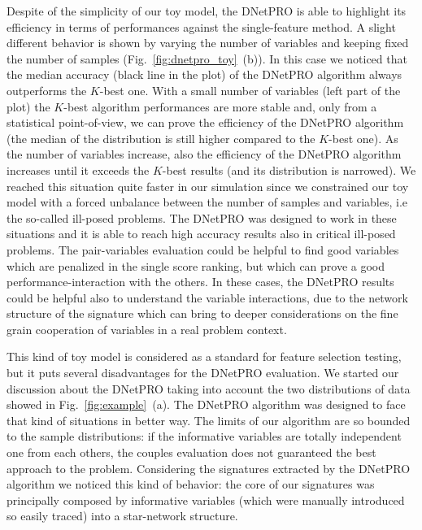 \documentclass{standalone}
\begin{document}
Despite of the simplicity of our toy model, the \textsf{DNetPRO} is able to highlight its efficiency in terms of performances against the single-feature method.
A slight different behavior is shown by varying the number of variables and keeping fixed the number of samples (Fig.~\ref{fig:dnetpro_toy}~(b)).
In this case we noticed that the median accuracy (black line in the plot) of the \textsf{DNetPRO} algorithm always outperforms the $K$-best one.
With a small number of variables (left part of the plot) the $K$-best algorithm performances are more stable and, only from a statistical point-of-view, we can prove the efficiency of the \textsf{DNetPRO} algorithm (the median of the distribution is still higher compared to the $K$-best one).
As the number of variables increase, also the efficiency of the \textsf{DNetPRO} algorithm increases until it exceeds the $K$-best results (and its distribution is narrowed).
We reached this situation quite faster in our simulation since we constrained our toy model with a forced unbalance between the number of samples and variables, i.e the so-called ill-posed problems.
The \textsf{DNetPRO} was designed to work in these situations and it is able to reach high accuracy results also in critical ill-posed problems.
The pair-variables evaluation could be helpful to find good variables which are penalized in the single score ranking, but which can prove a good performance-interaction with the others.
In these cases, the \textsf{DNetPRO} results could be helpful also to understand the variable interactions, due to the network structure of the signature which can bring to deeper considerations on the fine grain cooperation of variables in a real problem context.

This kind of toy model is considered as a standard for feature selection testing, but it puts several disadvantages for the \textsf{DNetPRO} evaluation.
We started our discussion about the \textsf{DNetPRO} taking into account the two distributions of data showed in Fig.~\ref{fig:example}~(a).
The \textsf{DNetPRO} algorithm was designed to face that kind of situations in better way.
The limits of our algorithm are so bounded to the sample distributions: if the informative variables are totally independent one from each others, the couples evaluation does not guaranteed the best approach to the problem.
Considering the signatures extracted by the \textsf{DNetPRO} algorithm we noticed this kind of behavior: the core of our signatures was principally composed by informative variables (which were manually introduced so easily traced) into a star-network structure.
\end{document}
